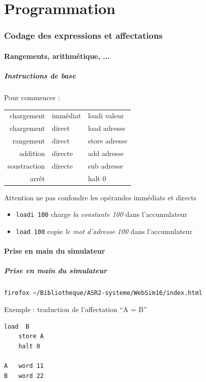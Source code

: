 \part{Programmation}

\section{Codage des expressions et affectations}
\subsection{Rangements, arithmétique, ...}
\begin{frame}
\frametitle{Instructions de base}
Pour commencer : \\
\begin{center}
\begin{tabular}{|rll|}
\hline
chargement & \alert{immédiat} & \alert{loadi valeur} \\
chargement & \alert{direct} & \alert{load adresse} \\
\hline
rangement  &direct & \alert{store adresse} \\
\hline \hline
addition &directe & \alert{add adresse} \\
soustraction &directe & \alert{sub adresse} \\
\hline \hline
arrêt && \alert{halt 0} \\
\hline
\end{tabular}
\end{center}
\alert{Attention ne pas confondre} les opérandes immédiats et directs 
\begin{itemize}
\item \texttt{loadi 100} charge \emph{la constante 100} dans l'accumulateur
\item \texttt{load 100} copie \emph{le mot d'adresse 100} dans l'accumulateur
\end{itemize}
\end{frame}


\subsection{Prise en main du simulateur}

\begin{frame}[containsverbatim]
  \frametitle{Prise en main du simulateur}

{\small
\verb+firefox ~/Bibliotheque/ASR2-systeme/WebSim16/index.html+
}

\alert{Exemple} : traduction de l'affectation ``A = B''

\begin{lstlisting}[frame=single]
    load  B
    store A
    halt 0

A   word 11
B   word 22
\end{lstlisting}

\end{frame}


